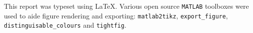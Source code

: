 \documentclass[a4paper]{article}
\begin{document}


\tableofcontents

This report was typeset using \LaTeX. Various open source \texttt{MATLAB} toolboxes were used to aide figure rendering and exporting: \texttt{matlab2tikz}, \texttt{export\_figure}, \texttt{distinguisable\_colours} and \texttt{tightfig}.

\thispagestyle{empty}
\clearpage


    
    
    
    
    
    \clearpage
        
    
    
    

    \clearpage
    
    
    
    

	\clearpage
	
	
    
    
    
    \clearpage
    
    \printbibliography
\end{document}
